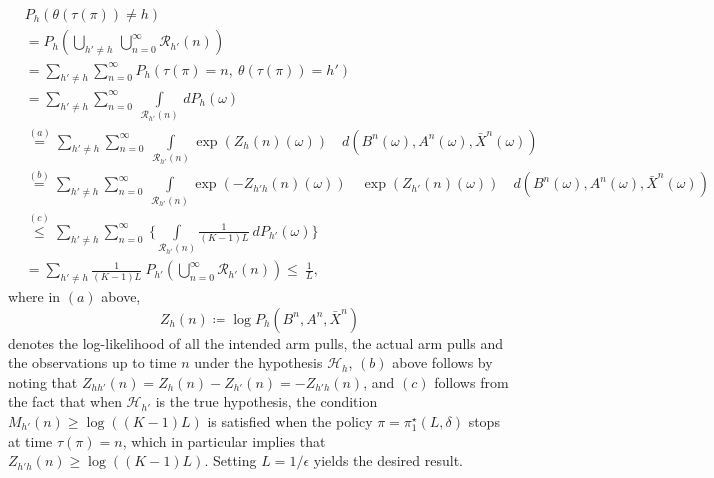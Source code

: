 \begin{align}
&P_h(\theta(\tau(\pi))\neq h)\nonumber\\
&=P_h\left(\bigcup\limits_{h'\neq h}\,\bigcup\limits_{n=0}^{\infty}\mathcal{R}_{h'}(n)\right)\nonumber\\
&= \sum\limits_{h'\neq h}\sum\limits_{n=0}^{\infty}P_h(\tau(\pi)=n,~\theta(\tau(\pi))=h')\nonumber\\
&= \sum\limits_{h'\neq h}\sum\limits_{n=0}^{\infty}~\int\limits_{\mathcal{R}_{h'}(n)}\,dP_h(\omega)\nonumber\\
&\stackrel{(a)}{=}\sum\limits_{h'\neq h}\sum\limits_{n=0}^{\infty}~\int\limits_{\mathcal{R}_{h'}(n)}\exp(Z_h(n)(\omega))\quad d(B^n(\omega),A^n(\omega),\bar{X}^n(\omega))\nonumber\\
&\stackrel{(b)}{=}\sum\limits_{h'\neq h}\sum\limits_{n=0}^{\infty}~\int\limits_{\mathcal{R}_{h'}(n)}\exp({-Z_{h'h}(n)(\omega)})\quad {\exp}(Z_{h'}(n)(\omega))\quad d(B^n(\omega),A^n(\omega),\bar{X}^n(\omega))\nonumber\\
&\stackrel{(c)}{\leq} \sum\limits_{h'\neq h}\sum\limits_{n=0}^{\infty}~\bigg\lbrace\int\limits_{\mathcal{R}_{h'}(n)}\frac{1}{(K-1)L}~dP_{h'}(\omega)\bigg\rbrace\nonumber\\
&=\sum\limits_{h'\neq h}\frac{1}{(K-1)L}~P_{h'}\left(\bigcup\limits_{n=0}^{\infty}\mathcal{R}_{h'}(n)\right){\leq}~ \frac{1}{L},
\end{align}
where in $(a)$ above, $$Z_{h}(n)\coloneqq \log P_h(B^n,A^n,\bar{X}^n)$$ denotes the log-likelihood of all the intended arm pulls, the actual arm pulls and the observations up to time $n$ under the hypothesis $\mathcal{H}_h$, $(b)$ above follows by noting that $Z_{hh'}(n)=Z_{h}(n)-Z_{h'}(n)=-Z_{h'h}(n)$, and $(c)$ follows from the fact that when $\mathcal{H}_{h'}$ is the true hypothesis, the condition $M_{h'}(n)\geq \log((K-1)L)$ is satisfied when the policy $\pi=\pi_1^\star(L, \delta)$ stops at time $\tau(\pi)=n$, which in particular implies that $Z_{h'h}(n)\geq \log((K-1)L)$. Setting $L=1/\epsilon$ yields the desired result.

